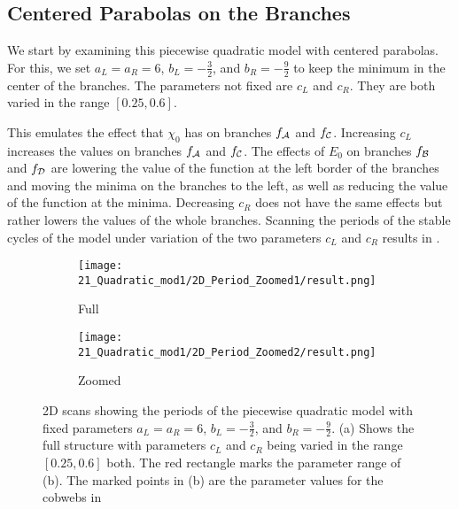\subsection{Centered Parabolas on the Branches}

We start by examining this piecewise quadratic model with centered parabolas.
For this, we set $a_L = a_R = 6$, $b_L = -\frac{3}{2}$, and $b_R = -\frac{9}{2}$ to keep the minimum in the center of the branches.
The parameters not fixed are $c_L$ and $c_R$.
They are both varied in the range $[0.25, 0.6]$.

This emulates the effect that $\chi_0$ has on branches $f_{\mathcal{A}}$ and $f_{\mathcal{C}}$.
Increasing $c_L$ increases the values on branches $f_{\mathcal{A}}$ and $f_{\mathcal{C}}$.
The effects of $E_0$ on branches $f_{\mathcal{B}}$ and $f_{\mathcal{D}}$ are lowering the value of the function at the left border of the branches and moving the minima on the branches to the left, as well as reducing the value of the function at the minima.
Decreasing $c_R$ does not have the same effects but rather lowers the values of the whole branches.
Scanning the periods of the stable cycles of the model under variation of the two parameters $c_L$ and $c_R$ results in .

\begin{figure}
	\centering
	\begin{subfigure}{0.4\textwidth}
		\centering
		\texttt{[image: 21\_Quadratic\_mod1/2D\_Period\_Zoomed1/result.png]}
		\caption{Full}
		\label{fig:setup.quad.even.period.full}
	\end{subfigure}
	\begin{subfigure}{0.4\textwidth}
		\centering
		\texttt{[image: 21\_Quadratic\_mod1/2D\_Period\_Zoomed2/result.png]}
		\caption{Zoomed}
		\label{fig:setup.quad.even.period.zoomed}
	\end{subfigure}
	\caption[2D scans showing periods of the even piecewise quadratic model]{
		2D scans showing the periods of the piecewise quadratic model with fixed parameters $a_L = a_R = 6$, $b_L = -\frac{3}{2}$, and $b_R = -\frac{9}{2}$.
		(a) Shows the full structure with parameters $c_L$ and $c_R$ being varied in the range $[0.25, 0.6]$ both.
		The red rectangle marks the parameter range of (b).
		The marked points in (b) are the parameter values for the cobwebs in 
	}
\end{figure}

